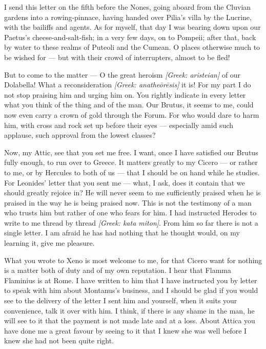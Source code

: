 

 I send this letter on the fifth before the Nones, going aboard from the Cluvian gardens into a rowing-pinnace, having handed over Pilia's villa by the Lucrine, with the bailiffs and agents. As for myself, that day I was bearing down upon our Paetus's cheese-and-salt-fish; in a very few days, on to Pompeii; after that, back by water to these realms of Puteoli and the Cumean. O places otherwise much to be wished for --- but with their crowd of interrupters, almost to be fled!

 But to come to the matter --- O the great heroism \textit{[Greek: aristeian]} of our Dolabella! What a reconsideration \textit{[Greek: anathe\=or\=esis]} it is! For my part I do not stop praising him and urging him on. You rightly indicate in every letter what you think of the thing and of the man. Our Brutus, it seems to me, could now even carry a crown of gold through the Forum. For who would dare to harm him, with cross and rock set up before their eyes --- especially amid such applause, such approval from the lowest classes?

 Now, my Attic, see that you set me free. I want, once I have satisfied our Brutus fully enough, to run over to Greece. It matters greatly to my Cicero --- or rather to me, or by Hercules to both of us --- that I should be on hand while he studies. For Leonides' letter that you sent me --- what, I ask, does it contain that we should greatly rejoice in? He will never seem to me sufficiently praised when he is praised in the way he is being praised now. This is not the testimony of a man who trusts him but rather of one who fears for him. I had instructed Herodes to write to me thread by thread \textit{[Greek: kata miton]}. From him so far there is not a single letter. I am afraid he has had nothing that he thought would, on my learning it, give me pleasure.

 What you wrote to Xeno is most welcome to me, for that Cicero want for nothing is a matter both of duty and of my own reputation. I hear that Flamma Flaminius is at Rome. I have written to him that I have instructed you by letter to speak with him about Montanus's business, and I should be glad if you would see to the delivery of the letter I sent him and yourself, when it suits your convenience, talk it over with him. I think, if there is any shame in the man, he will see to it that the payment is not made late and at a loss. About Attica you have done me a great favour by seeing to it that I knew she was well before I knew she had not been quite right.
